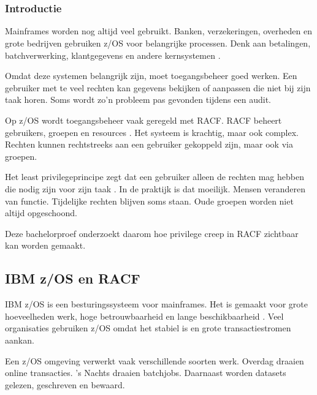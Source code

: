 \chapter[Stand van zaken]{}%
\label{ch:stand-van-zaken}

\subsection*{Introductie}

Mainframes worden nog altijd veel gebruikt. Banken, verzekeringen, overheden en grote bedrijven gebruiken z/OS voor belangrijke processen. Denk aan betalingen, batchverwerking, klantgegevens en andere kernsystemen \autocite{Ebbers2012,Buecker2014}.

Omdat deze systemen belangrijk zijn, moet toegangsbeheer goed werken. Een gebruiker met te veel rechten kan gegevens bekijken of aanpassen die niet bij zijn taak horen. Soms wordt zo'n probleem pas gevonden tijdens een audit.

Op z/OS wordt toegangsbeheer vaak geregeld met RACF. RACF beheert gebruikers, groepen en resources \autocite{Singh2014,IBMRACFAdmin2023}. Het systeem is krachtig, maar ook complex. Rechten kunnen rechtstreeks aan een gebruiker gekoppeld zijn, maar ook via groepen.

Het least privilegeprincipe zegt dat een gebruiker alleen de rechten mag hebben die nodig zijn voor zijn taak \autocite{SaltzerSchroeder1975,NISTSP80053r5}. In de praktijk is dat moeilijk. Mensen veranderen van functie. Tijdelijke rechten blijven soms staan. Oude groepen worden niet altijd opgeschoond.

Deze bachelorproef onderzoekt daarom hoe privilege creep in RACF zichtbaar kan worden gemaakt.

\section{IBM z/OS en RACF}

IBM z/OS is een besturingssysteem voor mainframes. Het is gemaakt voor grote hoeveelheden werk, hoge betrouwbaarheid en lange beschikbaarheid \autocite{Ebbers2012}. Veel organisaties gebruiken z/OS omdat het stabiel is en grote transactiestromen aankan.

Een z/OS omgeving verwerkt vaak verschillende soorten werk. Overdag draaien online transacties. 's Nachts draaien batchjobs. Daarnaast worden datasets gelezen, geschreven en bewaard.

